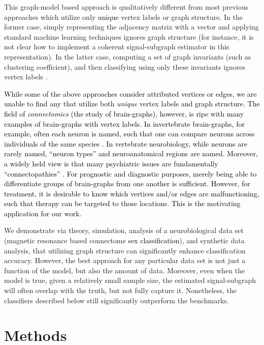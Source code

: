 \documentclass[10pt,journal,cspaper,compsoc]{IEEEtran}
\providecommand{\tk}[1]{\textcolor{black}{#1}}
\newcommand{\comment}[1]{}
\begin{document}
This graph-model based approach is qualitatively different from most previous approaches which utilize only \tk{unique} vertex labels or graph structure.  In the former case, simply representing the adjacency matrix with a vector and applying standard machine learning techniques ignores graph structure (for instance, it is not clear how to implement a coherent signal-subgraph estimator in this representation).  In the latter case, computing a set of graph invariants (such as clustering coefficient), and then classifying using only these invariants ignores vertex labels \tk{\cite{Kudo2005,Ketkar2009,Bunke2011}}.  \comment{Neither of these approaches use both vertex labels and graph structure.}  


\tk{While some of the above approaches consider attributed vertices or edges, we are unable to find any that utilize both \emph{unique} vertex labels and graph structure. The field of \emph{connectomics} (the study of brain-graphs), however, is ripe with many examples of brain-graphs with vertex labels.  In invertebrate brain-graphs, for example, often each neuron is named, such that one can compare neurons across individuals of the same species \cite{North2007}.  In vertebrate neurobiology, while neurons are rarely named, ``neuron types''  \cite{Shepherd2007} and neuroanatomical regions \cite{Nolte2002} are named.  Moreover, a widely held view is that many psychiatric issues are fundamentally ``connectopathies'' \cite{LichtmanSanes08, Bassett2009}.  For prognostic and diagnostic purposes, merely being able to differentiate groups of brain-graphs from one another is sufficient.  However, for treatment, it is desirable to know which vertices and/or edges are malfunctioning, such that therapy can be targeted to those locations. This is the motivating application for our work.}

We demonstrate via theory, simulation, analysis of a neurobiological data set (magnetic resonance based connectome \tk{sex classification}), and synthetic data analysis, that utilizing graph structure can significantly enhance classification accuracy.  However, the best approach for any particular data set is not just a function of the model, but also the amount of data.  Moreover, even when the model is true, given a relatively small sample size, the estimated signal-subgraph will often overlap with the truth, but not fully capture it.  Nonetheless, the classifiers described below still significantly outperform the benchmarks.


\section{Methods} %
\label{sec:methods}
\end{document}
